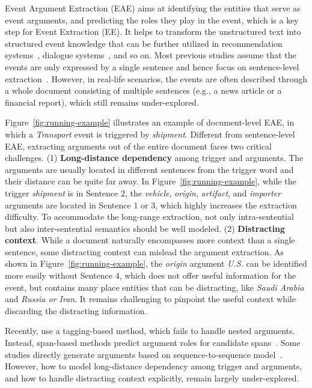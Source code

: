 

Event Argument Extraction (EAE) aims at identifying the entities that serve as event arguments, and predicting the roles they play in the event, which is a key step for Event Extraction (EE).
It helps to transform the unstructured text into structured event knowledge that can be further utilized in recommendation systems~\cite{li-etal-2020-gaia}, dialogue systems~\cite{DBLP:conf/aime/ZhangCB20}, and so on.
Most previous studies assume that the events are only expressed by a single sentence and hence focus on sentence-level extraction~\cite{chen-etal-2015-event, liu-etal-2018-jointly, DBLP:conf/aaai/Zhou0ZWXL21}.
However, in real-life scenarios, the events are often described through a whole document consisting of multiple sentences (e.g., a news article or a financial report), which still remains under-explored.

Figure~\ref{fig:running-example} illustrates an example of document-level EAE, in which a \emph{Transport} event is triggered by \emph{shipment}.
Different from sentence-level EAE, extracting arguments out of the entire document faces two critical challenges.
(1) \textbf{Long-distance dependency} among trigger and arguments.
The arguments are usually located in different sentences from the trigger word and their distance can be quite far away. 
In Figure~\ref{fig:running-example}, while the trigger \emph{shipment} is in Sentence $2$, the \emph{vehicle}, \emph{origin}, \emph{artifact}, and \emph{importer} arguments are located in Sentence $1$ or $3$, which highly increases the extraction difficulty.
To accommodate the long-range extraction, not only intra-sentential but also inter-sentential semantics should be well modeled.
(2) \textbf{Distracting context}.
While a document naturally encompasses more context than a single sentence, some distracting context can mislead the argument extraction.
As shown in Figure~\ref{fig:running-example}, the \emph{origin} argument \emph{U.S.} can be identified more easily without Sentence $4$, which does not offer useful information for the event, but contains many place entities that can be distracting, like \emph{Saudi Arabia} and \emph{Russia or Iran}.
It remains challenging to pinpoint the useful context while discarding the distracting information.

Recently, \citet{du-cardie-2020-document} use a tagging-based method, which fails to handle nested arguments.
Instead, span-based methods predict argument roles for candidate spans~\citep{rams, two-step}. 
Some studies directly generate arguments based on sequence-to-sequence model~\citep{wikievent}.
However, how to model long-distance dependency among trigger and arguments, and how to handle distracting context explicitly, remain largely under-explored.


